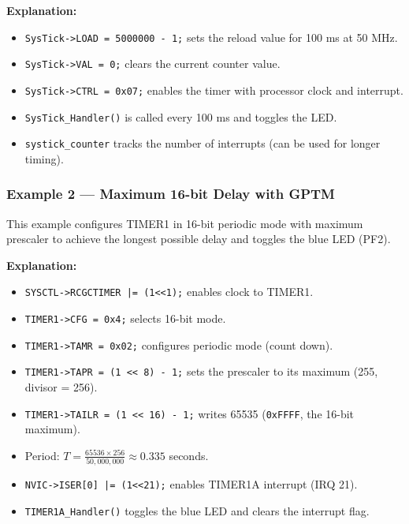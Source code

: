 

\noindent
\textbf{Explanation:}
\begin{itemize}[nosep]
  \item \texttt{SysTick->LOAD = 5000000 - 1;} sets the reload value for 100 ms at 50 MHz.
  \item \texttt{SysTick->VAL = 0;} clears the current counter value.
  \item \texttt{SysTick->CTRL = 0x07;} enables the timer with processor clock and interrupt.
  \item \texttt{SysTick\_Handler()} is called every 100 ms and toggles the LED.
  \item \texttt{systick\_counter} tracks the number of interrupts (can be used for longer timing).
\end{itemize}

\newpage
\subsubsection{Example 2 — Maximum 16-bit Delay with GPTM}

This example configures TIMER1 in 16-bit periodic mode with maximum prescaler to achieve the longest possible delay and toggles the blue LED (PF2).



\noindent
\textbf{Explanation:}
\begin{itemize}[nosep]
  \item \texttt{SYSCTL->RCGCTIMER |= (1<<1);} enables clock to TIMER1.
  \item \texttt{TIMER1->CFG = 0x4;} selects 16-bit mode.
  \item \texttt{TIMER1->TAMR = 0x02;} configures periodic mode (count down).
  \item \texttt{TIMER1->TAPR = (1 << 8) - 1;} sets the prescaler to its maximum (255, divisor = 256).
  \item \texttt{TIMER1->TAILR = (1 << 16) - 1;} writes 65535 (\texttt{0xFFFF}, the 16-bit maximum).
  \item Period: $T = \frac{65536 \times 256}{50{,}000{,}000} \approx 0.335$ seconds.
  \item \texttt{NVIC->ISER[0] |= (1<<21);} enables TIMER1A interrupt (IRQ 21).
  \item \texttt{TIMER1A\_Handler()} toggles the blue LED and clears the interrupt flag.
\end{itemize}

